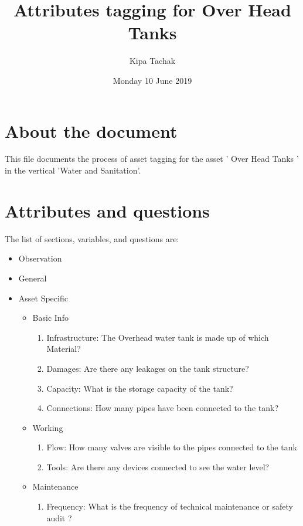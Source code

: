 \documentclass[oneside,twocolumn]{article}
\title{Attributes tagging for 
Over Head Tanks 
}
\author{Kipa Tachak}
\date{Monday 10 June 2019}
\begin{document}
\maketitle

\section{About the document}
This file documents the process of asset tagging for the asset '
Over Head Tanks 
' in the
vertical 'Water and Sanitation'.

\section{Attributes and questions}
The list of sections, variables, and questions are:
    \begin{itemize}
    \item Observation
    \item General
    \item Asset Specific
    \begin{itemize}
\item Basic Info
\begin{enumerate}
\item Infrastructure: 
The Overhead water tank is made up of which Material? 

\item Damages: 
Are there any leakages on the tank structure? 

\item Capacity: What is the storage capacity of the tank?
\item Connections: 
How many pipes have been connected to the tank? 

\end{enumerate}

\item Working
\begin{enumerate}
\item Flow: 
How many valves are visible to the pipes connected to the tank 

\item Tools: 
Are there any devices connected to see the water level? 

\end{enumerate}

\item Maintenance
\begin{enumerate}
\item Frequency: What is the frequency of technical maintenance or safety audit ?
\end{enumerate}

\end{itemize}

    \end{itemize}
\end{document}
